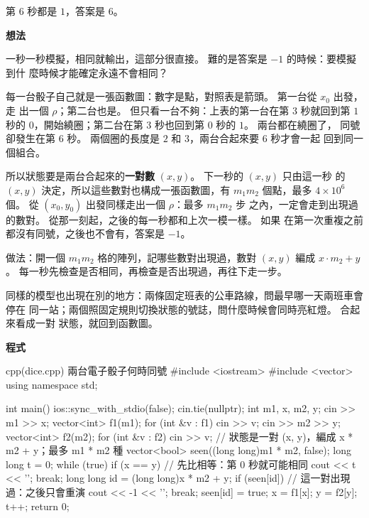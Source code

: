 第 $6$ 秒都是 $1$，答案是 $6$。

\textbf{想法}

一秒一秒模擬，相同就輸出，這部分很直接。 難的是答案是 $-1$ 的時候：要模擬到什
麼時候才能確定永遠不會相同？

每一台骰子自己就是一張函數圖：數字是點，對照表是箭頭。 第一台從 $x_0$ 出發，走
出一個 $\rho$；第二台也是。 但只看一台不夠：上表的第一台在第 $3$ 秒就回到第 $1$
秒的 $0$，開始繞圈；第二台在第 $3$ 秒也回到第 $0$ 秒的 $1$。 兩台都在繞圈了，
同號卻發生在第 $6$ 秒。 兩個圈的長度是 $2$ 和 $3$，兩台合起來要 $6$ 秒才會一起
回到同一個組合。

所以狀態要是兩台合起來的\textbf{一對數} $(x, y)$。 下一秒的 $(x, y)$ 只由這一秒
的 $(x, y)$ 決定，所以這些數對也構成一張函數圖，有 $m_1 m_2$ 個點，最多
$4 \times 10^6$ 個。 從 $(x_0, y_0)$ 出發同樣走出一個 $\rho$：最多 $m_1 m_2$ 步
之內，一定會走到出現過的數對。 從那一刻起，之後的每一秒都和上次一模一樣。 如果
在第一次重複之前都沒有同號，之後也不會有，答案是 $-1$。

做法：開一個 $m_1 m_2$ 格的陣列，記哪些數對出現過，數對 $(x, y)$ 編成
$x \cdot m_2 + y$。 每一秒先檢查是否相同，再檢查是否出現過，再往下走一步。

同樣的模型也出現在別的地方：兩條固定班表的公車路線，問最早哪一天兩班車會停在
同一站；兩個照固定規則切換狀態的號誌，問什麼時候會同時亮紅燈。 合起來看成一對
狀態，就回到函數圖。

\textbf{程式}

\begin{example}[label=ex:dice]{cpp}{(dice.cpp) 兩台電子骰子何時同號}
#include <iostream>
#include <vector>
using namespace std;

int main() {
    ios::sync_with_stdio(false);
    cin.tie(nullptr);
    int m1, x, m2, y;
    cin >> m1 >> x;
    vector<int> f1(m1);
    for (int &v : f1) {
        cin >> v;
    }
    cin >> m2 >> y;
    vector<int> f2(m2);
    for (int &v : f2) {
        cin >> v;
    }
    // 狀態是一對 (x, y)，編成 x * m2 + y；最多 m1 * m2 種
    vector<bool> seen((long long)m1 * m2, false);
    long long t = 0;
    while (true) {
        if (x == y) {                      // 先比相等：第 0 秒就可能相同
            cout << t << '\n';
            break;
        }
        long long id = (long long)x * m2 + y;
        if (seen[id]) {                    // 這一對出現過：之後只會重演
            cout << -1 << '\n';
            break;
        }
        seen[id] = true;
        x = f1[x];
        y = f2[y];
        t++;
    }
    return 0;
}
\end{example}

